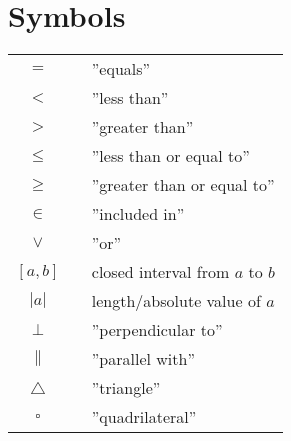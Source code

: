 



\section*{Symbols} \label{Symbol}
\renewcommand{\arraystretch}{1.2}
\begin{tabular}{@{}cp{0.4cm}l}
$ = $ && ''equals'' \\
$ < $ && ''less than'' \\
$ > $ && ''greater than'' \\
$ \leq $ && ''less than or equal to'' \\
$ \geq $ && ''greater than or equal to'' \\		
$ \in $ && ''included in'' \\
$ \vee $&&''or''\\
$ [a, b] $ && closed interval from $ a $ to $ b $\\
$|a| $ &&  length/absolute value of $ a $\\
$\perp $ &&  ''perpendicular to'' \\
$\parallel $ &&  ''parallel with'' \\
$\triangle $ &&  ''triangle'' \\
$\square $ &&  ''quadrilateral'' \\
\end{tabular}
\renewcommand{\arraystretch}{1}

